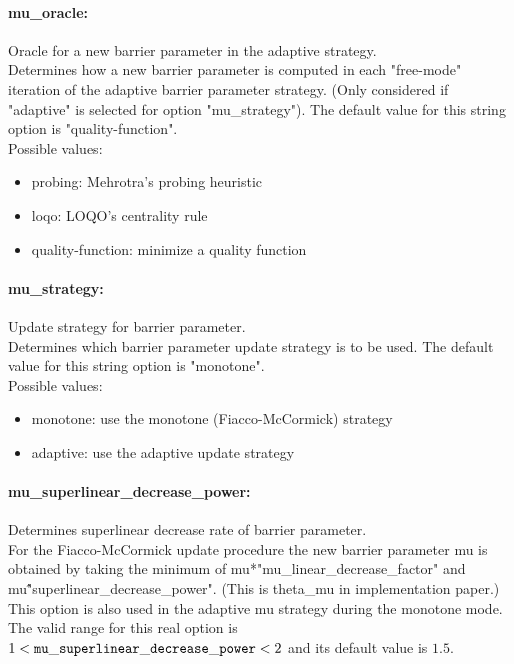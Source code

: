 \paragraph{mu\_oracle:}\label{sec:mu_oracle} Oracle for a new barrier parameter in the adaptive strategy. $\;$ \\
 Determines how a new barrier parameter is
computed in each "free-mode" iteration of the
adaptive barrier parameter strategy. (Only
considered if "adaptive" is selected for option
"mu\_strategy").
The default value for this string option is "quality-function".
\\ 
Possible values:
\begin{itemize}
   \item probing: Mehrotra's probing heuristic
   \item loqo: LOQO's centrality rule
   \item quality-function: minimize a quality function
\end{itemize}

\paragraph{mu\_strategy:}\label{sec:mu_strategy} Update strategy for barrier parameter. $\;$ \\
 Determines which barrier parameter update
strategy is to be used.
The default value for this string option is "monotone".
\\ 
Possible values:
\begin{itemize}
   \item monotone: use the monotone (Fiacco-McCormick) strategy
   \item adaptive: use the adaptive update strategy
\end{itemize}

\paragraph{mu\_superlinear\_decrease\_power:}\label{sec:mu_superlinear_decrease_power} Determines superlinear decrease rate of barrier parameter. $\;$ \\
 For the Fiacco-McCormick update procedure the new
barrier parameter mu is obtained by taking the
minimum of mu*"mu\_linear\_decrease\_factor" and
mu\^"superlinear\_decrease\_power".  (This is
theta\_mu in implementation paper.) This option
is also used in the adaptive mu strategy during
the monotone mode. The valid range for this real option is 
$1 <  {\tt mu\_superlinear\_decrease\_power } <  2$
and its default value is $1.5$.



